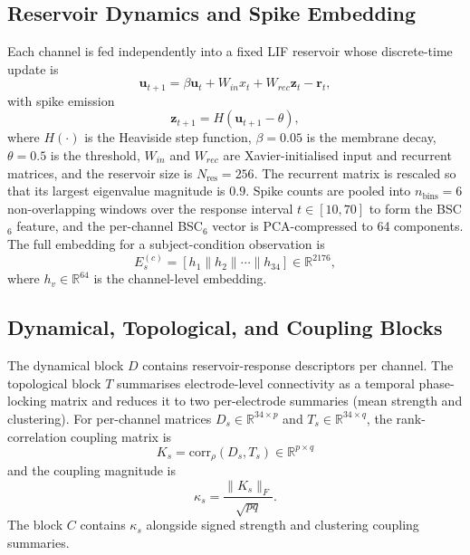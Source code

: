 \documentclass[journal]{IEEEtran}
\begin{document}
\subsection{Reservoir Dynamics and Spike Embedding}
Each channel is fed independently into a fixed LIF reservoir whose discrete-time update is
\begin{equation}
\mathbf{u}_{t+1}=\beta\mathbf{u}_{t}+W_{in}x_t+W_{rec}\mathbf{z}_t-\mathbf{r}_t,
\label{eq:lif}
\end{equation}
with spike emission
\begin{equation}
\mathbf{z}_{t+1}=H(\mathbf{u}_{t+1}-\theta),
\label{eq:spike}
\end{equation}
where $H(\cdot)$ is the Heaviside step function, $\beta=0.05$ is the membrane decay, $\theta=0.5$ is the threshold, $W_{in}$ and $W_{rec}$ are Xavier-initialised input and recurrent matrices, and the reservoir size is $N_{\text{res}}=256$. The recurrent matrix is rescaled so that its largest eigenvalue magnitude is $0.9$. Spike counts are pooled into $n_{\text{bins}}=6$ non-overlapping windows over the response interval $t\in[10,70]$ to form the BSC$_6$ feature, and the per-channel BSC$_6$ vector is PCA-compressed to 64 components. The full embedding for a subject-condition observation is
\begin{equation}
E_s^{(c)}=\left[h_1\|h_2\|\cdots\|h_{34}\right]\in\mathbb{R}^{2176},
\label{eq:E}
\end{equation}
where $h_v\in\mathbb{R}^{64}$ is the channel-level embedding.

\subsection{Dynamical, Topological, and Coupling Blocks}
The dynamical block $D$ contains reservoir-response descriptors per channel. The topological block $T$ summarises electrode-level connectivity as a temporal phase-locking matrix and reduces it to two per-electrode summaries (mean strength and clustering). For per-channel matrices $D_s\in\mathbb{R}^{34\times p}$ and $T_s\in\mathbb{R}^{34\times q}$, the rank-correlation coupling matrix is
\begin{equation}
K_s = \mathrm{corr}_{\rho}(D_s,T_s) \in \mathbb{R}^{p\times q}
\end{equation}
and the coupling magnitude is
\begin{equation}
\kappa_s = \frac{\|K_s\|_F}{\sqrt{pq}}.
\label{eq:kappa}
\end{equation}
The block $C$ contains $\kappa_s$ alongside signed strength and clustering coupling summaries.
\end{document}
